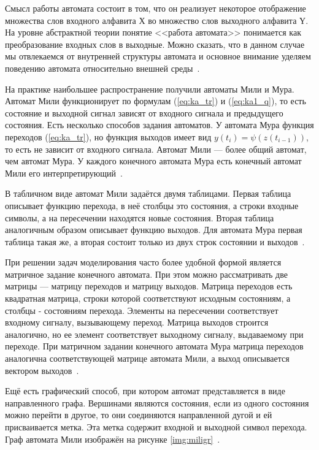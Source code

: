 Смысл работы автомата состоит в том, что он реализует некоторое отображение множества слов входного алфавита $Х$ во множество слов выходного алфавита $Ү$. На уровне абстрактной теории понятие <<работа автомата>> понимается как преобразование входных слов в выходные. Можно сказать, что в данном случае мы отвлекаемся от внутренней структуры автомата и основное внимание уделяем поведению автомата относительно внешней среды~\cite{ak_det}. 

На практике наибольшее распространение получили автоматы Мили и Мура. Автомат Мили функционирует по формулам (\ref{eq:ka_tr}) и (\ref{eq:ka1_q}), то есть состояние и выходной сигнал зависят от входного сигнала и предыдущего состояния. Есть несколько способов задания автоматов. У автомата Мура функция переходов  (\ref{eq:ka_tr}), но функция выходов имеет вид $y(t_i) = \psi(z(t_{i-1}))$, то есть не зависит от входного сигнала. Автомат Мили --- более общий автомат, чем автомат Мура. У каждого конечного автомата Мура есть конечный автомат Мили его интерпретирующий~\cite{ak_types}.

В табличном виде автомат Мили задаётся двумя таблицами. Первая таблица описывает функцию перехода, в неё столбцы это состояния, а строки входные символы, а на пересечении находятся новые состояния. Вторая таблица аналогичным образом описывает функцию выходов. Для автомата Мура первая таблица такая же, а вторая состоит только из двух строк состоянии и выходов~\cite{ak_types}.

При решении задач моделирования часто более удобной формой является матричное задание конечного автомата. При этом можно рассматривать две матрицы --- матрицу переходов и матрицу выходов. Матрица переходов есть квадратная матрица, строки которой соответствуют исходным состояниям, а столбцы - состояниям перехода. Элементы на пересечении соответствует входному сигналу, вызывающему переход. Матрица выходов строится аналогично, но ее элемент соответствует выходному сигналу, выдаваемому при переходе. При матричном задании конечного автомата Мура матрица переходов аналогична соответствующей матрице автомата Мили, а выход описывается вектором выходов~\cite{ak_types}.

Ещё есть графический способ, при котором автомат представляется в виде направленного графа. Вершинами являются состояния, если из одного состояния можно перейти в другое, то они соединяются направленной дугой и ей присваивается метка. Эта метка содержит входной и выходной символ перехода. Граф автомата Мили изображён на рисунке \ref{img:miligr}~\cite{ak_types}.

